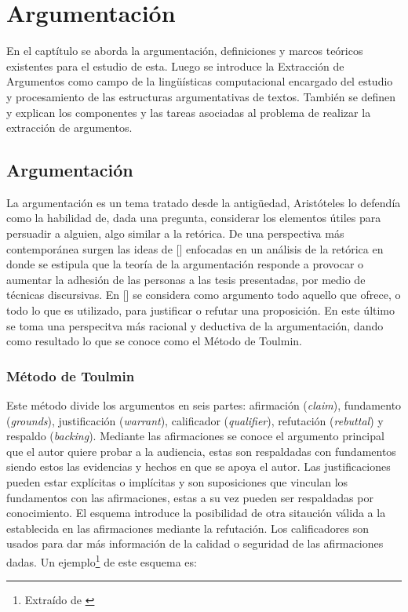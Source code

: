 \chapter{Argumentación}\label{chapter:argumentation}

En el captítulo se aborda la argumentación, definiciones y marcos teóricos existentes para el estudio de esta.
Luego se introduce la Extracción de Argumentos como campo de la lingüísticas computacional encargado del estudio 
y procesamiento de las estructuras argumentativas de textos. También se definen y explican los componentes y las tareas 
asociadas al problema de realizar la extracción de argumentos.

\section{Argumentación}

La argumentación es un tema tratado desde la antigüedad, Aristóteles lo defendía como la 
habilidad de, dada una pregunta, considerar los elementos útiles para persuadir a alguien, algo
similar a la retórica. De una perspectiva más contemporánea surgen las ideas de [\cite{perelman1969rhetoric}] 
enfocadas en un análisis de la retórica en donde se estipula que la teoría de la argumentación
responde a provocar o aumentar la adhesión de las personas a las tesis presentadas, por medio de 
técnicas discursivas. En [\cite{toulmin_2003}] se considera como argumento todo aquello que ofrece, 
o todo lo que es utilizado, para justificar o refutar una proposición. En este último se toma 
una perspecitva más racional y deductiva de la argumentación, dando como resultado lo que se 
conoce como el Método de Toulmin. 

\subsection{Método de Toulmin}

Este método divide los argumentos en seis partes: afirmación 
(\emph{claim}), fundamento (\emph{grounds}), justificación (\emph{warrant}), calificador 
(\emph{qualifier}), refutación (\emph{rebuttal}) y respaldo (\emph{backing}).
Mediante las afirmaciones se conoce el argumento principal que el autor quiere probar a la audiencia,
estas son respaldadas con fundamentos siendo estos las evidencias y hechos en que se apoya el autor.
Las justificaciones pueden estar explícitas o implícitas y son suposiciones que vinculan los
fundamentos con las afirmaciones, estas a su vez pueden ser respaldadas por conocimiento.
El esquema introduce la posibilidad de otra sitaución válida a la establecida en las afirmaciones
mediante la refutación. Los calificadores son usados para dar más información de la calidad o seguridad
de las afirmaciones dadas. Un ejemplo\footnote{Extraído de \cite{toulminArgument}} de este esquema es:

